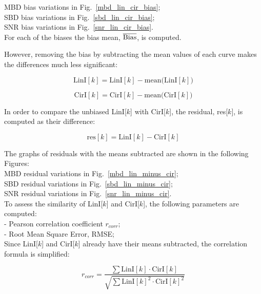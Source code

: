 \documentclass[letterpaper,twoside,12pt]{article}
\begin{document}
\indent MBD bias variations in Fig.~\ref{mbd_lin_cir_bias};  \\
\indent SBD bias variations in Fig.~\ref{sbd_lin_cir_bias};  \\
\indent SNR bias variations in Fig.~\ref{snr_lin_cir_bias}.  \\

For each of the biases the bias mean, $\overline{\rm Bias}$, is computed.

However, removing the bias by subtracting the mean values of each curve makes the differences much less significant:

\begin{equation}
  \label{subtr_mean_lin}
  \mathrm{LinI}[k] = \mathrm{LinI}[k] - \mathrm{mean(LinI}[k])
\end{equation}

\begin{equation}
  \label{subtr_mean_cir}
  \mathrm{CirI}[k] = \mathrm{CirI}[k] - \mathrm{mean(CirI}[k])
\end{equation}

\noindent In order to compare the unbiased LinI[$k$] with CirI[$k$], the residual, res[$k$], is computed as their difference:

\begin{equation}
  \label{resid}
  \mathrm{res}[k] = \mathrm{LinI}[k] - \mathrm{CirI}[k] 
\end{equation}

\noindent The graphs of residuals with the means subtracted are shown in the following Figures: \\

\indent MBD residual variations in Fig.~\ref{mbd_lin_minus_cir};  \\
\indent SBD residual variations in Fig.~\ref{sbd_lin_minus_cir};  \\
\indent SNR residual variations in Fig.~\ref{snr_lin_minus_cir}.  \\

To assess the similarity of LinI[$k$] and CirI[$k$], the following parameters are computed: \\

\noindent - Pearson correlation coefficient $r_{corr}$; \\
\noindent - Root Mean Square Error, RMSE; \\

Since LinI[$k$] and CirI[$k$] already have their means subtracted, the correlation formula is simplified:

\begin{equation}
  \label{corr}
  r_{corr} = \frac{\sum \mathrm{LinI}[k] \cdot \mathrm{CirI}[k]}{\sqrt{\sum \mathrm{LinI}[k]^2 \cdot 
                   \mathrm{CirI}[k]^2}}
\end{equation}
\end{document}
